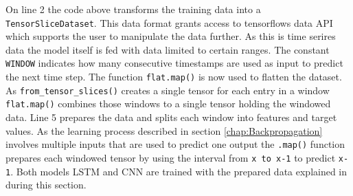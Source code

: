 On line 2 the code above transforms the training data into a \verb|TensorSliceDataset|. This data format grants access to tensorflows data API which supports the user to manipulate the data further. As this is time serires data the model itself is fed with data limited to certain ranges. The constant \verb|WINDOW| indicates how many consecutive timestamps are used as input to predict the next time step. The function \verb|flat.map()| is now used to flatten the dataset. As \verb|from_tensor_slices()| creates a single tensor for each entry in a window \verb|flat.map()| combines those windows to a single tensor holding the windowed data. Line 5 prepares the data and splits each window into features and target values. As the learning process described in section \ref{chap:Backpropagation} involves multiple inputs that are used to predict one output the \verb|.map()| function prepares each windowed tensor by using the interval from \verb|x to x-1| to predict \verb|x-1|.
Both models LSTM and CNN are trained with the prepared data explained in during this section. 


